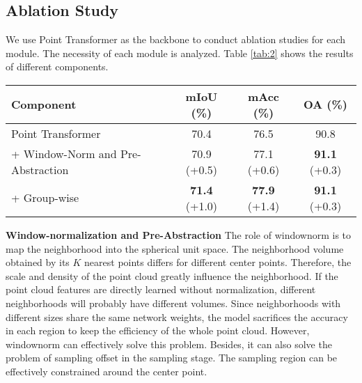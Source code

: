 \documentclass[10pt,twocolumn,letterpaper]{article}
\begin{document}
    \subsection{Ablation Study}

        We use Point Transformer as the backbone to conduct ablation studies for each module. The necessity of each module is analyzed. Table \ref{tab:2} shows the results of different components.

        \begin{table*}[!htb]\centering

            \renewcommand\arraystretch{1.2}
        \caption{Ablation studies: Different components.}
        \begin{tabular}{l|ccc}
        \toprule
        Component                           & mIoU (\%)        & mAcc (\%)       & OA (\%)       \\ \hline
        Point Transformer                    & 70.4        & 76.5        & 90.8        \\
        + Window-Norm   and Pre-Abstraction & 70.9 (+0.5) & 77.1 (+0.6) & \textbf{91.1} (+0.3) \\
        + Group-wise                        & \textbf{71.4} (+1.0) & \textbf{77.9} (+1.4) & \textbf{91.1} (+0.3) \\
        \bottomrule
        \end{tabular}
        \label{tab:2}
        \end{table*}

        \textbf{Window-normalization and Pre-Abstraction}  The role of windownorm is to map the neighborhood into the spherical unit space. The neighborhood volume obtained by its $K$ nearest points differs for different center points. Therefore, the scale and density of the point cloud greatly influence the neighborhood. If the point cloud features are directly learned without normalization, different neighborhoods will probably have different volumes. Since neighborhoods with different sizes share the same network weights, the model sacrifices the accuracy in each region to keep the efficiency of the whole point cloud. However, windownorm can effectively solve this problem. Besides, it can also solve the problem of sampling offset in the sampling stage. The sampling region can be effectively constrained around the center point.
\end{document}
